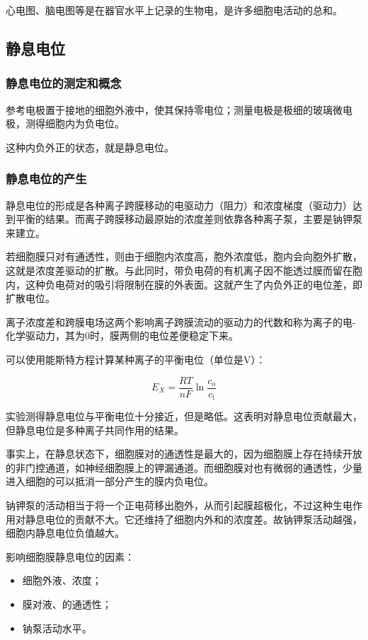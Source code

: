 心电图、脑电图等是在器官水平上记录的生物电，是许多细胞电活动的总和。

\subsection{静息电位}

\subsubsection{静息电位的测定和概念}

参考电极置于接地的细胞外液中，使其保持零电位；测量电极是极细的玻璃微电极，测得细胞内为负电位。

这种内负外正的状态，就是静息电位。

\subsubsection{静息电位的产生}

静息电位的形成是各种离子跨膜移动的电驱动力（阻力）和浓度梯度（驱动力）达到平衡的结果。而离子跨膜移动最原始的浓度差则依靠各种离子泵，主要是钠钾泵来建立。

若细胞膜只对有通透性，则由于细胞内浓度高，胞外浓度低，胞内会向胞外扩散，这就是浓度差驱动的扩散。与此同时，带负电荷的有机离子因不能透过膜而留在胞内，这种负电荷对的吸引将限制在膜的外表面。这就产生了内负外正的电位差，即扩散电位。

离子浓度差和跨膜电场这两个影响离子跨膜流动的驱动力的代数和称为离子的电-化学驱动力，其为0时，膜两侧的电位差便稳定下来。

可以使用能斯特方程计算某种离子的平衡电位（单位是V）：

\[E_X = \frac{RT}{nF} \ln \frac{c_\text{o}}{c_\text{i}}\]

实验测得静息电位与平衡电位十分接近，但是略低。这表明对静息电位贡献最大，但静息电位是多种离子共同作用的结果。

事实上，在静息状态下，细胞膜对的通透性是最大的，因为细胞膜上存在持续开放的非门控通道，如神经细胞膜上的钾漏通道。而细胞膜对也有微弱的通透性，少量进入细胞的可以抵消一部分产生的膜内负电位。

钠钾泵的活动相当于将一个正电荷移出胞外，从而引起膜超极化，不过这种生电作用对静息电位的贡献不大。它还维持了细胞内外和的浓度差。故钠钾泵活动越强，细胞内静息电位负值越大。

影响细胞膜静息电位的因素：
\begin{itemize}
	\item 细胞外液、浓度；
	\item 膜对液、的通透性；
	\item 钠泵活动水平。
\end{itemize}

